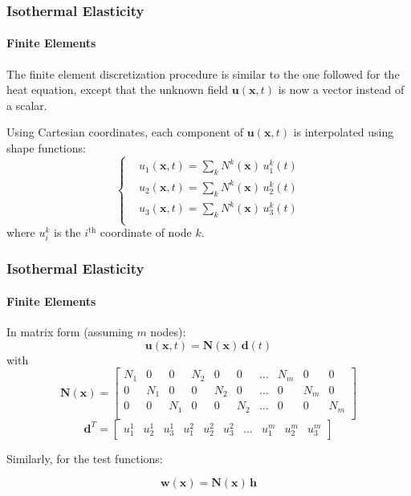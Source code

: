 \documentclass[10pt,xcolor=pdftex,dvipsnames,table]{beamer}
\begin{document}
\begin{frame}
	\frametitle{ Isothermal Elasticity }
	\framesubtitle{ Finite Elements }
	
	The finite element discretization procedure is similar to the one followed for the heat equation, except that the unknown field $\boldsymbol{u}(\boldsymbol{x}, t)$ is now a vector instead of a scalar.
	
		
	Using Cartesian coordinates, each component of $\boldsymbol{u}(\boldsymbol{x}, t)$ is interpolated using shape functions:
	\begin{equation*}
		\left\{
		\begin{aligned}
		&u_1(\boldsymbol{x}, t) = \sum_k N^k(\boldsymbol{x})\,u_1^k(t) \\
		&u_2(\boldsymbol{x}, t) = \sum_k N^k(\boldsymbol{x})\,u_2^k(t) \\
		&u_3(\boldsymbol{x}, t) = \sum_k N^k(\boldsymbol{x})\,u_3^k(t) \\
		\end{aligned}
		\right.
	\end{equation*}	
	where $u_i^k$ is the $i^{\text{th}}$ coordinate of node $k$.	
\end{frame}


\begin{frame}
	\frametitle{ Isothermal Elasticity }
	\framesubtitle{ Finite Elements }
	
	In matrix form (assuming $m$ nodes):
	\begin{equation*}
		\boldsymbol{u}(\boldsymbol{x},t) = \mathbf{N}(\boldsymbol{x})\,\boldsymbol{d}(t)
	\end{equation*}	
	with
	\begin{equation*}
		\mathbf{N}(\boldsymbol{x}) = 
		\begin{bmatrix}
			N_1 & 0   & 0   & N_2 & 0   & 0   & \dots & N_m & 0 & 0 \\
			0   & N_1 & 0   & 0   & N_2 & 0   & \dots & 0 & N_m & 0  \\
			0   & 0   & N_1 & 0   & 0   & N_2 & \dots & 0 & 0 & N_m  \\
		\end{bmatrix}
	\end{equation*}		
	\begin{equation*}
		\boldsymbol{d}^T = 
		\begin{bmatrix}
			u_1^1 & u_2^1 & u_3^1 & u_1^2 & u_2^2 & u_3^2 & \dots & u_1^m & u_2^m & u_3^m
		\end{bmatrix}
	\end{equation*}	


	Similarly, for the test functions:

	\begin{equation*}
		\boldsymbol{w}(\boldsymbol{x}) = \mathbf{N}(\boldsymbol{x})\,\boldsymbol{h}
	\end{equation*}	
	
\end{frame}
\end{document}
